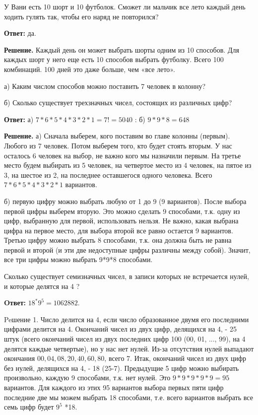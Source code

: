 
У Вани есть 10 шорт и 10 футболок. Сможет ли мальчик все лето каждый день ходить гулять так, чтобы его наряд не повторился?

\textbf{Ответ:} да.

\textbf{Решение.}
Каждый день он может выбрать шорты одним из 10 способов. Для каждых шорт у него еще есть 10 способов выбрать футболку. Всего 100 комбинаций. 100 дней это даже больше, чем «все лето».

а) Каким числом способов можно поставить 7 человек в колонну?

\noindent
б) Сколько существует трехзначных чисел, состоящих из различных цифр?

\textbf{Ответ:} а) $7 * 6 * 5 * 4 * 3 * 2 * 1=7!=5040$ : б) $9 * 9 * 8=648$

\textbf{Решение.}
а) Сначала выберем, кого поставим во главе колонны (первым). Любого из 7 человек. Потом выберем того, кто будет стоять вторым. У нас осталось 6 человек на выбор, не важно кого мы назначили первым. На третье место будем выбирать из 5 человек, на четвертое место из 4 человек, на пятое из 3, на шестое из 2, на последнее оставшегося одного человека. Всего $7 * 6 * 5 * 4 * 3 * 2 * 1$ вариантов.

\noindent
б) первую цифру можно выбрать любую от 1 до 9 (9 вариантов). После выбора первой цифры выберем вторую. Это можно сделать 9 способами, т.к. одну из цифр, выбранную для первой, использовать нельзя. Не важно, какая выбрана цифра на первое место, для выбора второй все равно остается 9 вариантов. Третью цифру можно выбрать 8 способами, т.к. она должна быть не равна первой и второй (и эти две недоступные цифры различны между собой). Значит, все три цифры можно выбрать 9*9*8 способами.


Сколько существует семизначных чисел, в записи которых не встречается нулей, и которые делятся на 4 ?

\textbf{Oтвет:} $18^* 9^5=1062882$.

Peшение 1. 
Число делится на 4, если число образованное двумя его последними цифрами делится на 4. Окончаний чисел из двух цифр, делящихся на 4, - 25 штук (всего окончаний чисел из двух последних цифр 100 (00, 01, ..., 99), на 4 делятся каждые четвертые), но у нас нет нулей. Из-за отсутствия нулей выпадают окончания $00,04,08,20,40,60,80$, всего 7. Итак, окончаний чисел из двух цифр без нулей, делящихся на 4, - 18 (25-7). Предыдущие 5 цифр можно выбирать произвольно, каждую 9 способами, т.к. нет нулей. Это
$9 * 9 * 9 * 9 * 9=95$ вариантов. Для каждого из этих 95 вариантов выбора первых пяти цифр последние две мы можем выбрать 18 способами, т.е. всего вариантов выбрать все семь цифр будет $9^5$ *18.

